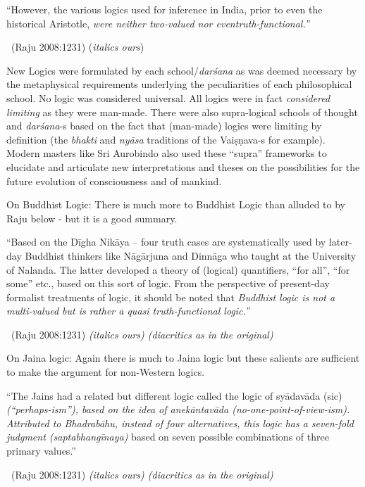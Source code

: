 \begin{myquote}
“However, the various logics used for inference in India, prior to even the historical Aristotle, \textit{were neither two-valued nor even\break truth-functional.”} 

\vskip -5pt

~\hfill (Raju 2008:1231) (\textit{italics ours})
\end{myquote}

New Logics were formulated by each school/\textit{darśana} as was deemed necessary by the metaphysical requirements underlying the peculiarities of each philosophical school. No logic was considered universal. All logics were in fact \textit{considered limiting} as they were man-made. There were also supra-logical schools of thought and \textit{darśana}-s based on the fact that (man-made) logics were limiting by definition (the \textit{bhakti} and \textit{nyāsa} traditions of the Vaiṣṇava-s for example). Modern masters like Sri Aurobindo also used these “supra” frameworks to elucidate and articulate new interpretations and theses on the possibilities for the future evolution of consciousness and of mankind.

On Buddhist Logic:  There is much more to Buddhist Logic than alluded to by Raju below - but it is a good summary.

\begin{myquote}
“Based on the Dīgha Nikāya – four truth cases are systematically used by later-day Buddhist thinkers like Nāgārjuna and Dinnāga who taught at the University of Nalanda. The latter developed a theory of (logical) quantifiers, “for all”, “for some” etc., based on this sort of logic. From the perspective of present-day formalist treatments of logic, it should be noted that \textit{Buddhist logic is not a multi-valued but is rather a quasi truth-functional logic.”}

~\hfill (Raju 2008:1231) \textit{(italics ours) (diacritics as in the original)}
\end{myquote}

On Jaina logic: Again there is much to Jaina logic but these salients are sufficient to make the argument for non-Western logics.

\begin{myquote}
“The Jains had a related but different logic called the logic of syādavāda (sic) \textit{(“perhaps-ism”), based on the idea of anekāntavāda (no-one-point-of-view-ism). Attributed to Bhadrabāhu, instead of four alternatives, this logic has a seven-fold judgment (saptabhangīnaya)} based on seven possible combinations of three primary values.” 

~\hfill (Raju 2008:1231) \textit{(italics ours) (diacritics as in the original)}
\end{myquote}

